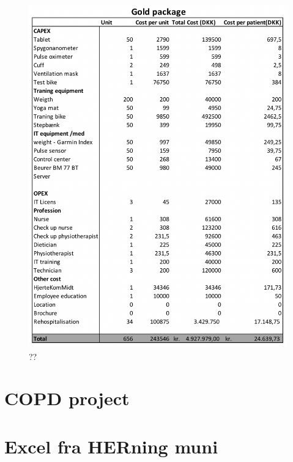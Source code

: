 \begin{figure}[H]
\centering
\includegraphics[width=1\textwidth]{Figure/Gold.png}
\caption{??}
\label{fig: Gold}
\end{figure} 


\chapter{COPD project}

\chapter{Excel fra HERning muni}
